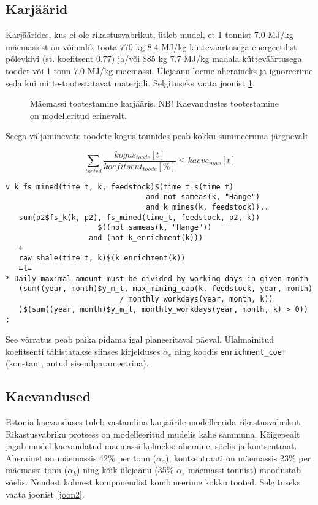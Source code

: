 \documentclass[10pt,a4paper]{article}
\begin{document}
\subsection{Karjäärid}
Karjäärides, kus ei ole rikastusvabrikut, ütleb mudel, et 1 tonnist 7.0 MJ/kg mäemassist on võimalik toota 770 kg 8.4 MJ/kg kütteväärtusega energeetilist põlevkivi (st. koefitsent 0.77) ja/või 885 kg 7.7 MJ/kg madala kütteväärtusega toodet või 1 tonn 7.0 MJ/kg mäemassi. Ülejäänu loeme aheraineks ja ignoreerime seda kui mitte-tootestatavat materjali. Selgituseks vaata joonist \ref{joon1}.

\begin{figure}

\caption{Mäemassi tootestamine karjääris. NB! Kaevandustes tootestamine on modelleritud erinevalt.
\label{joon1}}
\end{figure}

Seega väljaminevate toodete kogus tonnides peab kokku summeeruma järgne\-valt

\begin{equation}
\sum_{tooted} \frac{kogus_{toode} [t]}{koefitsent_{toode} [\%]} \le kaeve_{max} [t]
\end{equation}

\begin{verbatim}
v_k_fs_mined(time_t, k, feedstock)$(time_t_s(time_t)
                                and not sameas(k, "Hange")
                                and k_mines(k, feedstock))..
   sum(p2$fs_k(k, p2), fs_mined(time_t, feedstock, p2, k))
                     $((not sameas(k, "Hange")) 
                   and (not k_enrichment(k)))
   +
   raw_shale(time_t, k)$(k_enrichment(k))
   =l=
* Daily maximal amount must be divided by working days in given month
   (sum((year, month)$y_m_t, max_mining_cap(k, feedstock, year, month)
                          / monthly_workdays(year, month, k))
   )$(sum((year, month)$y_m_t, monthly_workdays(year, month, k) > 0))
;
\end{verbatim}

See võrratus peab paika pidama igal planeeritaval päeval. Ülalmainitud koefitsenti tähistatakse siinses kirjelduses $\mathit{\alpha}_e$ ning koodis \texttt{enrichment\_coef} (konstant, antud sisendparameetrina).

\subsection{Kaevandused}
Estonia kaevanduses tuleb vastandina karjäärile modelleerida rikastusvabrikut. Rikastusvabriku protsess on modelleeritud mudelis kahe sammuna. Kõigepealt jagab mudel kaevandatud mäemassi kolmeks: aheraine, sõelis ja kontsentraat. Aherainet on mäemassis 42\% per tonn ($\mathit{\alpha_a}$), kontsentraati on mäemassis 23\% per mäemassi tonn ($\mathit{\alpha_k}$) ning kõik ülejäänu (35\% $\mathit{\alpha_s}$ mäemassi tonnist) moodustab sõelis. Nendest kolmest komponendist kombineerime kokku tooted. Selgituseks vaata joonist \ref{joon2}.
\end{document}
